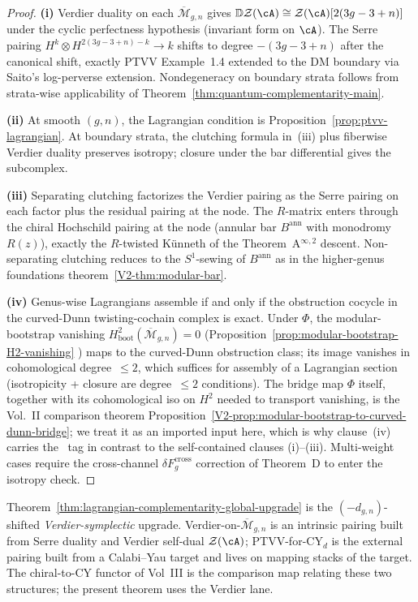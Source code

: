 \begin{proof}
\textbf{(i)} Verdier duality on each $\overline{\mathcal{M}}_{g,n}$ gives
$\mathbb{D}\mathcal{Z}(\cA)\cong \mathcal{Z}(\cA)[2(3g-3+n)]$ under the
cyclic perfectness hypothesis (invariant form on $\cA$). The Serre pairing
$H^k\otimes H^{2(3g-3+n)-k}\to k$ shifts to degree $-(3g-3+n)$ after the
canonical shift, exactly PTVV Example~1.4 extended to the DM boundary
via Saito's log-perverse extension. Nondegeneracy on boundary strata
follows from strata-wise applicability of
Theorem~\textup{\ref{thm:quantum-complementarity-main}}.

\textbf{(ii)} At smooth $(g,n)$, the Lagrangian condition is
Proposition~\textup{\ref{prop:ptvv-lagrangian}}. At boundary strata, the
clutching formula in~(iii) plus fiberwise Verdier duality preserves
isotropy; closure under the bar differential gives the subcomplex.

\textbf{(iii)} Separating clutching factorizes the Verdier pairing as
the Serre pairing on each factor plus the residual pairing at the node.
The $R$-matrix enters through the chiral Hochschild pairing at the
node (annular bar $B^{\mathrm{ann}}$ with monodromy $R(z)$), exactly the
$R$-twisted K\"unneth of the Theorem~A$^{\infty,2}$ descent. Non-separating
clutching reduces to the $S^1$-sewing of $B^{\mathrm{ann}}$ as in the
higher-genus foundations theorem~\textup{\ref{V2-thm:modular-bar}}.

\textbf{(iv)} Genus-wise Lagrangians assemble if and only if the
obstruction cocycle in the curved-Dunn twisting-cochain
complex is exact. Under $\Phi$, the modular-bootstrap
vanishing $H^2_{\mathrm{boot}}(\overline{\mathcal{M}}_{g,n})=0$
\textup{(}Proposition~\textup{\ref{prop:modular-bootstrap-H2-vanishing}}%
\textup{)} maps to the curved-Dunn obstruction class; its image
vanishes in cohomological degree~$\leq 2$, which suffices for
assembly of a Lagrangian section (isotropicity + closure are degree~$\leq 2$
conditions). The bridge map $\Phi$ itself, together with its
cohomological iso on $H^2$ needed to transport vanishing, is
the Vol.~II comparison theorem
Proposition~\ref{V2-prop:modular-bootstrap-to-curved-dunn-bridge};
we treat it as an imported input here, which is why clause~(iv)
carries the \ClaimStatusConditional\ tag in contrast to the
self-contained clauses (i)--(iii). Multi-weight cases require the
cross-channel $\delta F_g^{\mathrm{cross}}$ correction of Theorem~D to
enter the isotropy check.
\end{proof}

\begin{remark}
\label{rem:fm116-scope-global-upgrade}
Theorem~\textup{\ref{thm:lagrangian-complementarity-global-upgrade}}
is the $(-d_{g,n})$-shifted \emph{Verdier-symplectic} upgrade.
Verdier-on-$\overline{\mathcal{M}}_{g,n}$
is an intrinsic pairing built from Serre duality and Verdier self-dual
$\mathcal{Z}(\cA)$; PTVV-for-$\mathrm{CY}_d$ is the external pairing built
from a Calabi--Yau target and lives on mapping stacks of the target.
The chiral-to-CY functor of Vol~III is the comparison map relating
these two structures; the present theorem uses the Verdier lane.
\end{remark}

